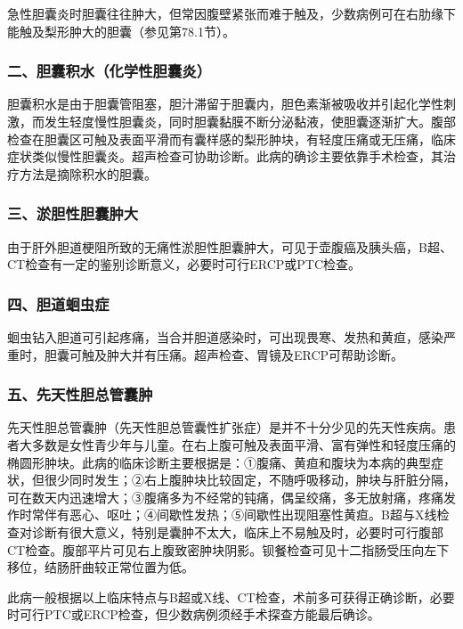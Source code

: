 急性胆囊炎时胆囊往往肿大，但常因腹壁紧张而难于触及，少数病例可在右肋缘下能触及梨形肿大的胆囊（参见第78.1节）。

\subsubsection{二、胆囊积水（化学性胆囊炎）}

胆囊积水是由于胆囊管阻塞，胆汁滞留于胆囊内，胆色素渐被吸收并引起化学性刺激，而发生轻度慢性胆囊炎，同时胆囊黏膜不断分泌黏液，使胆囊逐渐扩大。腹部检查在胆囊区可触及表面平滑而有囊样感的梨形肿块，有轻度压痛或无压痛，临床症状类似慢性胆囊炎。超声检查可协助诊断。此病的确诊主要依靠手术检查，其治疗方法是摘除积水的胆囊。

\subsubsection{三、淤胆性胆囊肿大}

由于肝外胆道梗阻所致的无痛性淤胆性胆囊肿大，可见于壶腹癌及胰头癌，B超、CT检查有一定的鉴别诊断意义，必要时可行ERCP或PTC检查。

\subsubsection{四、胆道蛔虫症}

蛔虫钻入胆道可引起疼痛，当合并胆道感染时，可出现畏寒、发热和黄疸，感染严重时，胆囊可触及肿大并有压痛。超声检查、胃镜及ERCP可帮助诊断。

\subsubsection{五、先天性胆总管囊肿}

先天性胆总管囊肿（先天性胆总管囊性扩张症）是并不十分少见的先天性疾病。患者大多数是女性青少年与儿童。在右上腹可触及表面平滑、富有弹性和轻度压痛的椭圆形肿块。此病的临床诊断主要根据是：①腹痛、黄疸和腹块为本病的典型症状，但很少同时发生；②右上腹肿块比较固定，不随呼吸移动，肿块与肝脏分隔，可在数天内迅速增大；③腹痛多为不经常的钝痛，偶呈绞痛，多无放射痛，疼痛发作时常伴有恶心、呕吐；④间歇性发热；⑤间歇性出现阻塞性黄疸。B超与X线检查对诊断有很大意义，特别是囊肿不太大，临床上不易触及时，必要时可行腹部CT检查。腹部平片可见右上腹致密肿块阴影。钡餐检查可见十二指肠受压向左下移位，结肠肝曲较正常位置为低。

此病一般根据以上临床特点与B超或X线、CT检查，术前多可获得正确诊断，必要时可行PTC或ERCP检查，但少数病例须经手术探查方能最后确诊。


